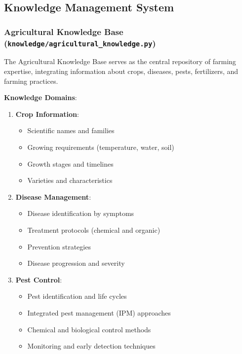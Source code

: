 \documentclass[12pt,a4paper]{article}
\begin{document}
\subsection{Knowledge Management System}

\subsubsection{Agricultural Knowledge Base (\texttt{knowledge/agricultural\_knowledge.py})}

The Agricultural Knowledge Base serves as the central repository of farming expertise, integrating information about crops, diseases, pests, fertilizers, and farming practices.

\textbf{Knowledge Domains}:
\begin{enumerate}[leftmargin=*]
    \item \textbf{Crop Information}:
    \begin{itemize}
        \item Scientific names and families
        \item Growing requirements (temperature, water, soil)
        \item Growth stages and timelines
        \item Varieties and characteristics
    \end{itemize}

    \item \textbf{Disease Management}:
    \begin{itemize}
        \item Disease identification by symptoms
        \item Treatment protocols (chemical and organic)
        \item Prevention strategies
        \item Disease progression and severity
    \end{itemize}

    \item \textbf{Pest Control}:
    \begin{itemize}
        \item Pest identification and life cycles
        \item Integrated pest management (IPM) approaches
        \item Chemical and biological control methods
        \item Monitoring and early detection techniques
    \end{itemize}


\end{enumerate}
\end{document}

